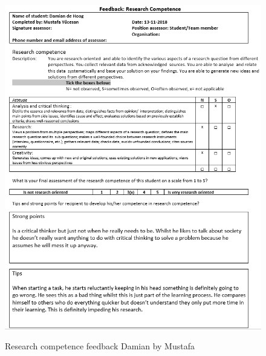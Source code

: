 \documentclass[12pt]{article}
\begin{document}
	\begin{figure}[p!]
		\centering
		\includegraphics[width=\columnwidth]{ResSklDamian2.PNG}\\
		\caption{Research competence feedback Damian by Mustafa}
	\end{figure}
\end{document}
